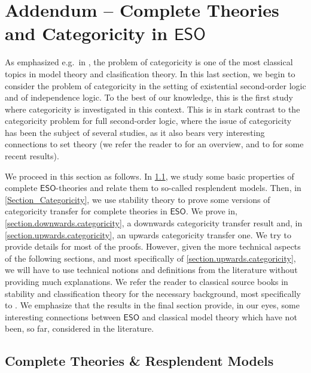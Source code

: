 \documentclass[a4paper]{amsart}
\theoremstyle{definition}
\theoremstyle{remark}
\newcommand\eso{\mathsf{ESO}}
\theoremstyle{definition}
\begin{document}
\section{Addendum -- Complete Theories and Categoricity in $\eso$}\label{section:complete_theories}

As emphasized e.g.\ in \cite{baldwin_categoricity}, the problem of categoricity is one of the most classical topics in model theory and clasification theory. In this last section, we begin to consider the problem of categoricity in the setting of existential second-order logic and of independence logic. To the best of our knowledge, this is the first study where categoricity is investigated in this context. This is in stark contrast to the categoricity problem for full second-order logic, where the issue of categoricity has been the subject of several studies, as it also bears very interesting connections to set theory (we refer the reader to \cite{sep-logic-higher-order} for an overview, and to \cite{SAARINEN_2025} for some recent results).

We proceed in this section as follows. In \cref{Section: Complete Theories}, we study some basic properties of complete $\eso$-theories and relate them to so-called resplendent models. Then, in \cref{Section_Categoricity}, we use stability theory to prove some versions of categoricity transfer for complete theories in $\eso$. We prove in, \cref{section.downwards.categoricity}, a downwards categoricity transfer result and, in \cref{section.upwards.categoricity}, an upwards categoricity transfer one. We try to provide details for most of the proofs. However, given the more technical aspects of the following sections, and most specifically of \cref{section.upwards.categoricity}, we will have to use technical notions and definitions from the literature without providing much explanations. We refer the reader to classical source books in stability and classification theory for the necessary background, most specifically to \cite{baldwin_categoricity,tentziegler,poizat2012course,baldwin2017fundamentals,shelah1990classification}. We emphasize that the results in the final section provide, in our eyes, some interesting connections between $\eso$ and classical model theory which have not been, so far, considered in the literature.

\subsection{Complete Theories \& Resplendent Models}\label{Section: Complete Theories}
\end{document}
